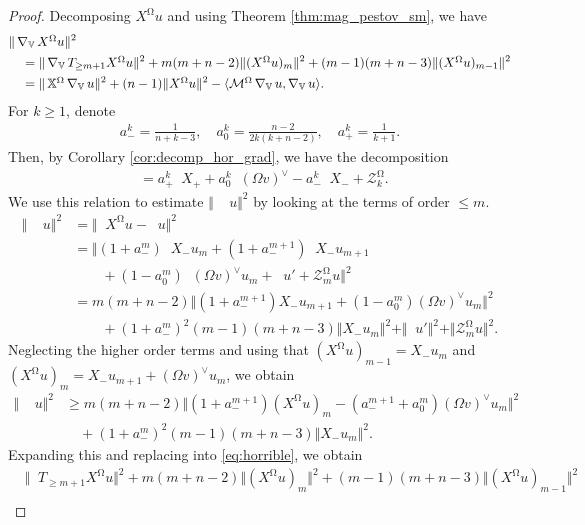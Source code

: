 \documentclass[12pt]{amsart}
\numberwithin{numbering}{section}
\theoremstyle{plain}
\theoremstyle{definition}
\theoremstyle{remark}
\numberwithin{equation}{section}
\DeclareMathOperator{\nv}{\nabla_{\mathbb{V}}}
\DeclareMathOperator{\nhs}{\nabla_{\mathbb{H}^{\mg}}}
\DeclareMathOperator{\xs}{\mathbb{X}^{\mg}}
\DeclareMathOperator{\mg}{\Omega}
\begin{document}
\begin{proof}
Decomposing $X^{\mg} u$ and using Theorem \ref{thm:mag_pestov_sm}, we have 
\begin{align} \label{eq:horrible}
&\Vert \nv X^{\mg} u \Vert^2 \\
&\quad = \Vert \nv T_{\geq m+1} X^{\mg} u \Vert^2 + m(m+n-2) \Vert (X^{\mg} u)_m \Vert^2 + (m-1)(m+n-3) \Vert (X^{\mg} u)_{m-1} \Vert^2 \notag\\ 
&\quad = \Vert \xs \nv u \Vert^2 + (n-1) \Vert  X^{\mg} u \Vert^2 - \langle \mathcal{M}^{\mg} \nv u, \nv u \rangle. \notag
\end{align}
For $k \geq 1$, denote 
\begin{align}
a_-^k = \frac{1}{n+k-3}, \quad a_0^k = \frac{n-2}{2k(k+n-2)}, \quad a_+^k = \frac{1}{k+1}.
\end{align}
Then, by Corollary \ref{cor:decomp_hor_grad}, we have the decomposition 
\begin{align*}
\nhs = a_+^k \nv X_+ + a_0^k \nv (\Omega v)^\vee - a_-^k \nv X_- + \mathcal{Z}_k^{\mg}.
\end{align*}
We use this relation to estimate $\Vert \xs \nv u \Vert^2$ by looking at the terms of order $\leq m$.
\begin{align*}
\Vert \xs \nv u \Vert^2
&= \Vert \nv X^{\mg} u - \nhs u \Vert^2 \\ 
&= \Vert (1 + a_-^m) \nv X_- u_m + (1 + a_-^{m+1}) \nv X_- u_{m+1} \\ 
&\quad \quad + (1 - a_0^m) \nv (\Omega v)^\vee u_m + \nv u' + \mathcal{Z}_m^{\mg} u \Vert^2 \\ 
&= m(m+n-2) \Vert (1 + a_-^{m+1}) X_- u_{m+1} + (1 - a_0^m) (\Omega v)^\vee u_m \Vert^2 \\
&\quad \quad + (1 + a_-^m)^2 (m-1)(m+n-3) \Vert X_- u_m \Vert^2 + \Vert \nv u' \Vert^2 + \Vert \mathcal{Z}_m^{\mg} u \Vert^2.
\end{align*}
Neglecting the higher order terms and using that $(X^{\mg} u)_{m-1} = X_- u_m$ and $(X^{\mg} u)_m = X_- u_{m+1} + (\Omega v)^\vee u_m$, we obtain 
\begin{align*}
\Vert \xs \nv u \Vert^2 & \geq m(m+n-2) \Vert (1 + a_-^{m+1}) (X^{\mg} u)_{m} - (a_-^{m+1} + a_0^m) (\Omega v)^\vee u_m \Vert^2 \\ 
&\quad + (1 + a_-^m)^2 (m-1)(m+n-3) \Vert X_- u_m \Vert^2.
\end{align*}
Expanding this and replacing into \eqref{eq:horrible}, we obtain 
\begin{align*}
&\Vert \nv T_{\geq m+1} X^{\mg} u \Vert^2 + m(m+n-2) \Vert (X^{\mg} u)_m \Vert^2 + (m-1)(m+n-3) \Vert (X^{\mg} u)_{m-1} \Vert^2 \\ 

\end{align*}
\end{proof}
\end{document}
